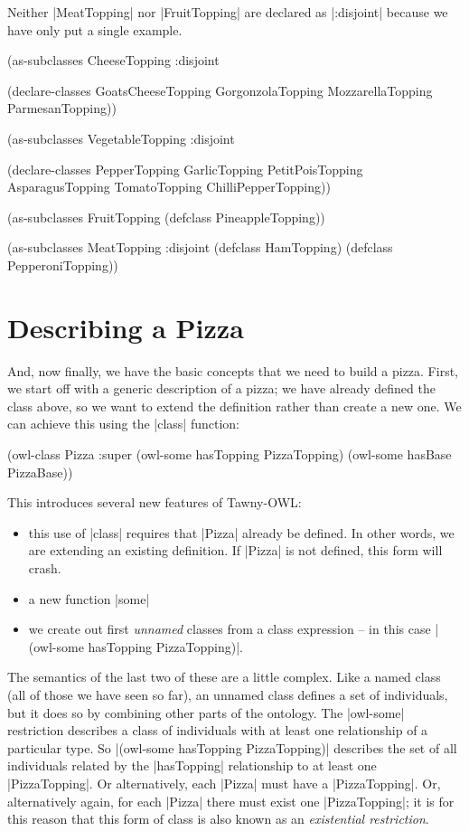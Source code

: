Neither |MeatTopping| nor |FruitTopping| are declared as |:disjoint| because
we have only put a single example.

\begin{tawny}
(as-subclasses
 CheeseTopping
 :disjoint

 (declare-classes
  GoatsCheeseTopping
  GorgonzolaTopping
  MozzarellaTopping
  ParmesanTopping))

(as-subclasses
 VegetableTopping
 :disjoint

 (declare-classes
  PepperTopping
  GarlicTopping
  PetitPoisTopping
  AsparagusTopping
  TomatoTopping
  ChilliPepperTopping))

(as-subclasses
 FruitTopping
 (defclass PineappleTopping))

(as-subclasses
 MeatTopping
 :disjoint
 (defclass HamTopping)
 (defclass PepperoniTopping))
\end{tawny}

\section{Describing a Pizza}
\label{sec:describing-pizza}

And, now finally, we have the basic concepts that we need to build a pizza.
First, we start off with a generic description of a pizza; we have already
defined the class above, so we want to extend the definition rather than
create a new one. We can achieve this using the |class| function:

\begin{tawny}
(owl-class Pizza
           :super
           (owl-some hasTopping PizzaTopping)
           (owl-some hasBase PizzaBase))
\end{tawny}

This introduces several new features of Tawny-OWL:
\begin{itemize}
\item this use of |class| requires that |Pizza| already be defined. In other
words, we are extending an existing definition. If |Pizza| is not defined,
this form will crash.
\item a new function |some|
\item we create out first \emph{unnamed} classes from a class expression -- in this
case |(owl-some hasTopping PizzaTopping)|.
\end{itemize}

The semantics of the last two of these are a little complex. Like a named
class (all of those we have seen so far), an unnamed class defines a set of
individuals, but it does so by combining other parts of the ontology. The
|owl-some| restriction describes a class of individuals with at least one
relationship of a particular type. So
|(owl-some hasTopping PizzaTopping)| describes the set of all individuals
related by the |hasTopping| relationship to at least one
|PizzaTopping|. Or alternatively, each |Pizza| must have a
|PizzaTopping|. Or, alternatively again, for each |Pizza| there must
exist one |PizzaTopping|; it is for this reason that this form of class
is also known as an \emph{existential restriction}.

